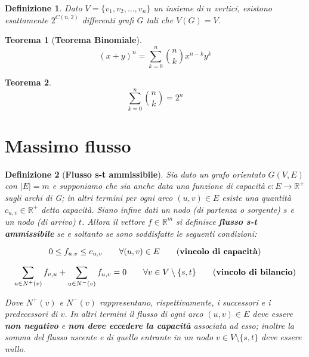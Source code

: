 \documentclass[10pt,a4paper,titlepage]{article}
\theoremstyle{break}
\newtheorem{myDef}{Definizione}
\theoremstyle{break}
\theoremstyle{break}
\newtheorem{myThm}{Teorema}
\begin{document}
\begin{myDef}
Dato $V = \lbrace v_1, v_2, \dotsc, v_n \rbrace$ un insieme di $n$ vertici, esistono esattamente $2^{C(n,2)}$ differenti grafi $G$ tali che $V(G)=V$.
\end{myDef}

\begin{myThm}[\textbf{Teorema Binomiale}]
\begin{equation}
(x+y)^n = \sum_{k=0}^{n} \binom{n}{k}x^{n-k}y^k
\end{equation}
\end{myThm}

\begin{myThm}
\begin{equation}
\sum_{k=0}^{n} \binom{n}{k} = 2^n
\end{equation}
\end{myThm}

\newpage
\section{Massimo flusso}

\begin{myDef}[\textbf{Flusso s-t ammissibile}]
Sia dato un grafo orientato $G(V,E)$ con $|E|=m$ e supponiamo che sia anche data una \textit{funzione di capacità} $c : E \rightarrow \mathbb{R}^+$ sugli archi di G; in altri termini per ogni arco $(u, v) \in E$ esiste una quantità $c_{u,v} \in \mathbb{R}^+$ detta \textit{capacità}. Siano infine dati un nodo (di partenza o sorgente) $s$ e un nodo (di arrivo) $t$.
Allora il vettore $f \in \mathbb{R}^m$ si definisce \textbf{flusso s-t ammissibile} se e soltanto se sono soddisfatte le seguenti condizioni:

\begin{equation}
0 \leq f_{u,v} \leq c_{u,v} \qquad \forall (u, v) \in E \qquad \text{(\textbf{vincolo di capacità})}
\end{equation}

\begin{equation}
\sum_{u \in N^+(v)} f_{v,u} + \sum_{u \in N^-(v)} f_{u,v} = 0 \qquad \forall v \in V \setminus \lbrace s, t \rbrace \qquad \text{(\textbf{vincolo di bilancio})}
\end{equation}

Dove $N^+(v)$ e $N^-(v)$  rappresentano, rispettivamente, i \textit{successori} e i \textit{predecessori} di $v$.
In altri termini il flusso di ogni arco $(u, v) \in E$ deve essere \textbf{non negativo} e \textbf{non deve eccedere la capacità} associata ad esso; inoltre la somma del flusso uscente e di quello entrante in un nodo $v \in V \setminus \lbrace s, t \rbrace$ deve essere nullo.
\end{myDef}
\end{document}
